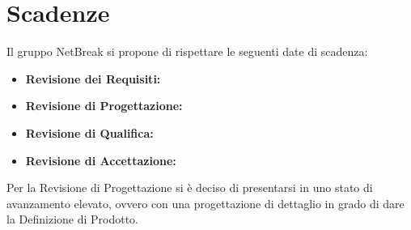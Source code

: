 \newpage
\section{Scadenze}
Il gruppo NetBreak si propone di rispettare le seguenti date di scadenza:
\begin{itemize}
	\item \textbf{Revisione dei Requisiti:}
	\item \textbf{Revisione di Progettazione:}
	\item \textbf{Revisione di Qualifica:}
	\item \textbf{Revisione di Accettazione:}
\end{itemize}
Per la Revisione di Progettazione si è deciso di presentarsi in uno stato di avanzamento elevato, ovvero con una progettazione di dettaglio in grado di dare la Definizione di Prodotto.